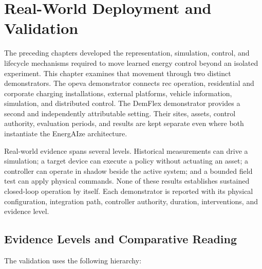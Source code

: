 \chapter{Real-World Deployment and Validation}
\label{chap:real-world}

The preceding chapters developed the representation, simulation, control, and lifecycle mechanisms required to move learned energy control beyond an isolated experiment. This chapter examines that movement through two distinct demonstrators. The \gls{opeva} demonstrator connects \gls{rec} operation, residential and corporate charging installations, external platforms, vehicle information, simulation, and distributed control. The DemFlex demonstrator provides a second and independently attributable setting. Their sites, assets, control authority, evaluation periods, and results are kept separate even where both instantiate the EnergAIze architecture.

Real-world evidence spans several levels. Historical measurements can drive a simulation; a target device can execute a policy without actuating an asset; a controller can operate in shadow beside the active system; and a bounded field test can apply physical commands. None of these results establishes sustained closed-loop operation by itself. Each demonstrator is reported with its physical configuration, integration path, controller authority, duration, interventions, and evidence level.


\section{Evidence Levels and Comparative Reading}
\label{sec:real-evidence-context}
\label{sec:real-evidence-levels}
\label{sec:rw-levels}

The validation uses the following hierarchy:

